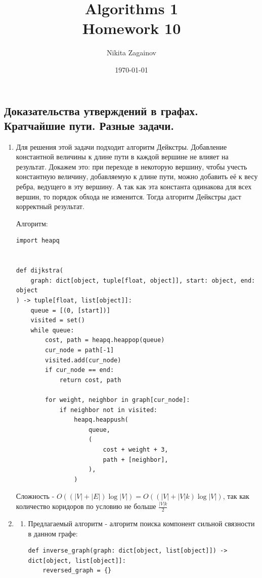 \documentclass{article}
\title{Algorithms 1 \\ Homework 10}
\author{Nikita Zagainov}
\date{\selectlanguage{english}\today}
\begin{document}
\maketitle

\begin{center}
	\section*{Доказательства утверждений в графах.
	  Кратчайшие пути. Разные задачи.}
\end{center}
\begin{enumerate}
	\item Для решения этой задачи подходит алгоритм
	      Дейкстры. Добавление константной величины к длине
	      пути в каждой вершине не влияет на результат. Докажем
	      это: при переходе в некоторую вершину, чтобы учесть
	      константную величину, добавляемую к длине пути,
	      можно добавить её к весу ребра, ведущего в эту вершину.
	      А так как эта константа одинакова для всех вершин,
	      то порядок обхода не изменится. Тогда алгоритм Дейкстры
	      даст корректный результат.

	      Алгоритм:
	      \begin{lstlisting}
import heapq


def dijkstra(
    graph: dict[object, tuple[float, object]], start: object, end: object
) -> tuple[float, list[object]]:
    queue = [(0, [start])]
    visited = set()
    while queue:
        cost, path = heapq.heappop(queue)
        cur_node = path[-1]
        visited.add(cur_node)
        if cur_node == end:
            return cost, path

        for weight, neighbor in graph[cur_node]:
            if neighbor not in visited:
                heapq.heappush(
                    queue,
                    (
                        cost + weight + 3,
                        path + [neighbor],
                    ),
                )
    \end{lstlisting}

	      Сложность - $O((|V| + |E|) \log |V|) =
		      O((|V| + |V|k) \log |V|)$, так как
	      количество коридоров по условию не больше $\frac{|V|k}{2}$

	\item
	      \begin{enumerate}
		      \item
		            Предлагаемый алгоритм - алгоритм поиска компонент
		            сильной связности в данном графе:
		            \begin{lstlisting}
def inverse_graph(graph: dict[object, list[object]]) -> dict[object, list[object]]:
	reversed_graph = {}


\end{lstlisting}
\end{enumerate}
\end{enumerate}
\end{document}
